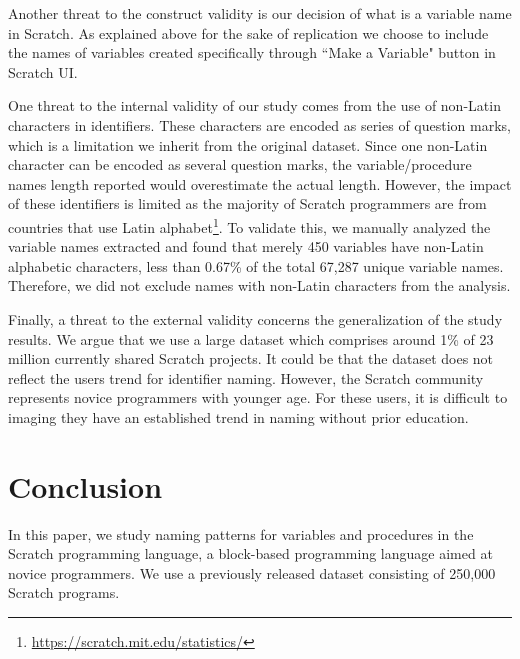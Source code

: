 \documentclass[conference]{IEEEtran}
\begin{document}
Another threat to the construct validity is our decision of what is a variable name in Scratch. As explained above for the sake of replication we choose to include the names of variables created specifically through ``Make a Variable" button in Scratch UI. 

One threat to the internal validity of our study comes from the use of non-Latin characters in identifiers. These characters are encoded as series of question marks, which is a limitation we inherit from the original dataset. Since one non-Latin character can be encoded as several question marks, the variable/procedure names length reported would overestimate the actual length. However, the impact of these identifiers is limited as the majority of Scratch programmers are from countries that use Latin alphabet\footnote{\url{https://scratch.mit.edu/statistics/}}. To validate this, we manually analyzed the variable names extracted and found that merely 450 variables have non-Latin alphabetic characters, less than 0.67\% of the total 67,287 unique variable names. Therefore, we did not exclude names with non-Latin characters from the analysis.

Finally, a threat to the external validity concerns the generalization of the study results. We argue that we use a large dataset which comprises around 1\% of 23 million currently shared Scratch projects. It could be that the dataset does not reflect the users trend for identifier naming. However, the Scratch community represents novice programmers with younger age. For these users, it is difficult to imaging they have an established trend in naming without prior education.

\section{Conclusion}
In this paper, we study naming patterns for variables and procedures in the Scratch programming language, a block-based programming language aimed at novice programmers. We use a previously released dataset consisting of 250,000 Scratch programs. 
\end{document}
